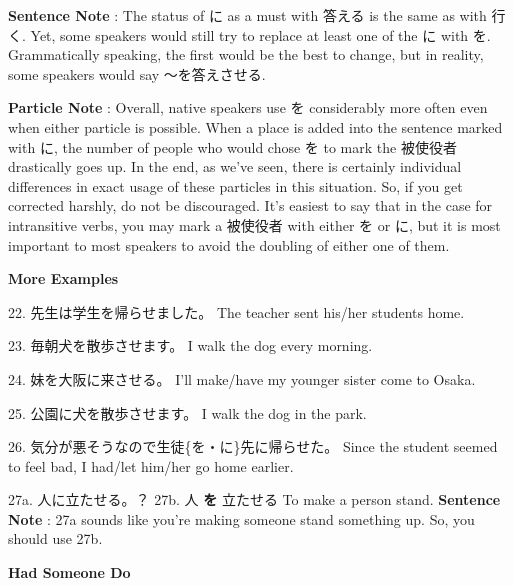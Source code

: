 \par{\textbf{Sentence Note }: The status of に as a must with 答える is the same as with 行く. Yet, some speakers would still try to replace at least one of the に with を. Grammatically speaking, the first would be the best to change, but in reality, some speakers would say ～を答えさせる. }

\par{\textbf{Particle Note }: Overall, native speakers use を considerably more often even when either particle is possible. When a place is added into the sentence marked with に, the number of people who would chose を to mark the 被使役者 drastically goes up. In the end, as we've seen, there is certainly individual differences in exact usage of these particles in this situation. So, if you get corrected harshly, do not be discouraged. It's easiest to say that in the case for intransitive verbs, you may mark a 被使役者 with either を or に, but it is most important to most speakers to avoid the doubling of either one of them. }

\begin{center}
 \textbf{More Examples }
\end{center}

\par{22. 先生は学生を帰らせました。 \hfill\break
The teacher sent his\slash her students home. }

\par{23. 毎朝犬を散歩させます。 \hfill\break
I walk the dog every morning. }

\par{24. 妹を大阪に来させる。 \hfill\break
I'll make\slash have my younger sister come to Osaka. }

\par{25. 公園に犬を散歩させます。 \hfill\break
I walk the dog in the park. }
 
\par{26. 気分が悪そうなので生徒\{を・に\}先に帰らせた。 \hfill\break
Since the student seemed to feel bad, I had\slash let him\slash her go home earlier. }
 
\par{27a. 人に立たせる。？ \hfill\break
27b. 人 \textbf{を }立たせる \hfill\break
To make a person stand. \hfill\break
\hfill\break
\textbf{Sentence Note }: 27a sounds like you're making someone stand something up. So, you should use 27b. }

\begin{center}
 \textbf{Had Someone Do }
\end{center}
 

